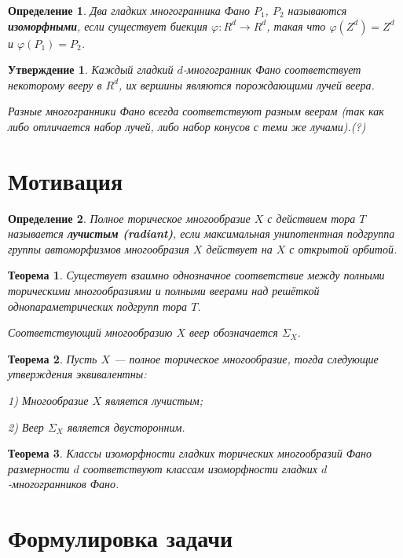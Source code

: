 \documentclass[12pt,notitlepage]{article}
\newtheorem{theorem}{Теорема}
\newtheorem{definition}{Определение}
\newtheorem{statement}{Утверждение}
\begin{document}
	\begin{definition}
		Два гладких многогранника Фано $P_1$, $P_2$ называются \textbf{изоморфными}, если существует биекция $\varphi:R^d \rightarrow R^d$, такая что $\varphi(Z^d) = Z^d$ и $\varphi(P_1) = P_2$.
	\end{definition}
	\begin{statement}
		Каждый гладкий $d$-многогранник Фано соответствует некоторому вееру в $R^d$, их вершины являются порождающими лучей веера.
		
		Разные многогранники Фано всегда соответствуют разным веерам (так как либо отличается набор лучей, либо набор конусов с теми же лучами).(?)
	\end{statement}
	
	\section{Мотивация}
	
	\begin{definition}
		Полное торическое многообразие $X$  с действием тора $T$ называется \textbf{лучистым (radiant)}, если максимальная унипотентная подгруппа группы автоморфизмов  многообразия $X$ действует на $X$ с открытой орбитой.
	\end{definition}
	\begin{theorem}
		Существует взаимно однозначное соответствие между полными торическими многообразиями и полными веерами над решёткой однопараметрических подгрупп тора $T$.
		
		Соответствующий многообразию $X$ веер обозначается $\Sigma_X$.
	\end{theorem}
	\begin{theorem}
		Пусть $X$ --- полное торическое многообразие, тогда следующие утверждения эквивалентны:
		
		1) Многообразие $X$ является лучистым;
		
		2) Веер $\Sigma_X$ является двусторонним.
	\end{theorem}
	
	\begin{theorem}
		Классы изоморфности гладких торических многообразий Фано размерности $d$ соответствуют классам изоморфности гладких $d$-многогранников Фано.
	\end{theorem}
	
	\section{Формулировка задачи}
	
\end{document}
